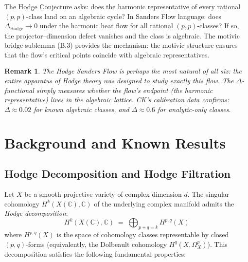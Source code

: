 \documentclass[11pt]{article}
\newtheorem{remark}[theorem]{Remark}
\theoremstyle{definition}
\begin{document}
\noindent
The Hodge Conjecture asks: does the harmonic representative of every rational
$(p,p)$-class land on an algebraic cycle?  In Sanders Flow language: does
$\Delta_{\mathrm{Hodge}} \to 0$ under the harmonic heat flow for all rational
$(p,p)$-classes?  If so, the projector--dimension defect vanishes and the class is
algebraic.  The motivic bridge sublemma (B.3) provides the mechanism: the motivic
structure ensures that the flow's critical points coincide with algebraic representatives.

\begin{remark}
The Hodge Sanders Flow is perhaps the most natural of all six: the entire
apparatus of Hodge theory was designed to study exactly this flow.  The $\Delta$-functional
simply measures whether the flow's endpoint (the harmonic representative) lives in the
algebraic lattice.  CK's calibration data confirms: $\Delta \approx 0.02$ for known
algebraic classes, and $\Delta \approx 0.6$ for analytic-only classes.
\end{remark}

\section{Background and Known Results}
\label{sec:background}

\subsection{Hodge Decomposition and Hodge Filtration}
\label{sec:hodge-decomp}

Let $X$ be a smooth projective variety of complex dimension $d$.  The
singular cohomology $H^k(X(\mathbb{C}), \mathbb{C})$ of the underlying
complex manifold admits the \emph{Hodge decomposition}:
\begin{equation}\label{eq:hodge-decomp}
  H^k(X(\mathbb{C}), \mathbb{C})
  \;=\;
  \bigoplus_{p+q=k} H^{p,q}(X)
\end{equation}
where $H^{p,q}(X)$ is the space of cohomology classes representable by
closed $(p,q)$-forms (equivalently, the Dolbeault cohomology
$H^q(X, \Omega_X^p)$).  This decomposition satisfies the following
fundamental properties:
\end{document}
